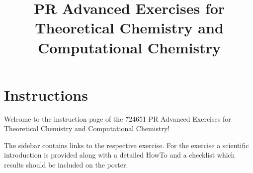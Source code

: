 \documentclass[
  letterpaper,
]{article}
\title{PR Advanced Exercises for Theoretical Chemistry and Computational
Chemistry}
\author{}
\date{}
\renewcommand*\contentsname{Table of contents}
\newcommand\contentsname{Table of contents}
\begin{document}
\maketitle
\pagestyle{mystyle}

\ifdefined\Shaded\renewenvironment{Shaded}{\begin{tcolorbox}[boxrule=0pt, frame hidden, breakable, colback={shadecolor}, enhanced]}{\end{tcolorbox}}\fi

\renewcommand*\contentsname{Table of contents}
{
\hypersetup{linkcolor=}
\setcounter{tocdepth}{3}
\tableofcontents
}

\hypertarget{instructions}{%
\section{Instructions}\label{instructions}}

Welcome to the instruction page of the 724651 PR Advanced Exercises for
Theoretical Chemistry and Computational Chemistry!

The sidebar contains links to the respective exercise. For the exercise
a scientific introduction is provided along with a detailed HowTo and a
checklist which results should be included on the poster.
\end{document}
